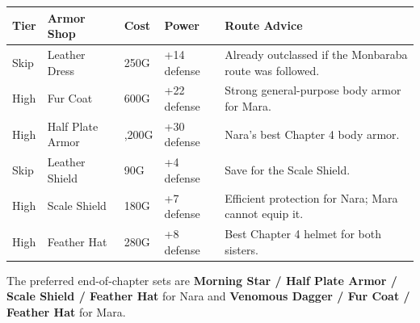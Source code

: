 \documentclass[
  american,
  10pt,
  letterpaper,
  oneside,
  open=any]{scrreprt}
\newcounter{none} %
\newenvironment{guidetable}{%
  \small\setstretch{1.0}%
  \setlength{\tabcolsep}{4pt}%
  \setlength{\LTpre}{8pt}\setlength{\LTpost}{10pt}%
  \renewcommand{\arraystretch}{1.16}%
}{ }
\begin{document}
\begin{guidetable}

{\def\LTcaptype{none} %
\begin{longtable}[]{@{}
  >{\raggedright\arraybackslash}p{}
  >{\raggedright\arraybackslash}p{}
  >{\raggedleft\arraybackslash}p{}
  >{\raggedleft\arraybackslash}p{}
  >{\raggedright\arraybackslash}p{}@{}}
\toprule\noalign{}
\begin{minipage}[b]{\linewidth}\raggedright
\color{GuideGreen}\bfseries Tier
\end{minipage} & \begin{minipage}[b]{\linewidth}\raggedright
\color{GuideGreen}\bfseries Armor Shop
\end{minipage} & \begin{minipage}[b]{\linewidth}\raggedleft
\color{GuideGreen}\bfseries Cost
\end{minipage} & \begin{minipage}[b]{\linewidth}\raggedleft
\color{GuideGreen}\bfseries Power
\end{minipage} & \begin{minipage}[b]{\linewidth}\raggedright
\color{GuideGreen}\bfseries Route Advice
\end{minipage} \\
\midrule\noalign{}
\endhead
\bottomrule\noalign{}
\endlastfoot
Skip & Leather Dress & 250G & +14 defense & Already outclassed if the
Monbaraba route was followed. \\
High & Fur Coat & 600G & +22 defense & Strong general-purpose body armor
for Mara. \\
High & Half Plate Armor & 1,200G & +30 defense & Nara's best Chapter 4
body armor. \\
Skip & Leather Shield & 90G & +4 defense & Save for the Scale Shield. \\
High & Scale Shield & 180G & +7 defense & Efficient protection for Nara;
Mara cannot equip it. \\
High & Feather Hat & 280G & +8 defense & Best Chapter 4 helmet for both
sisters. \\
\end{longtable}
}

\end{guidetable}

The preferred end-of-chapter sets are \textbf{Morning Star / Half Plate
Armor / Scale Shield / Feather Hat} for Nara and \textbf{Venomous Dagger
/ Fur Coat / Feather Hat} for Mara.
\end{document}
